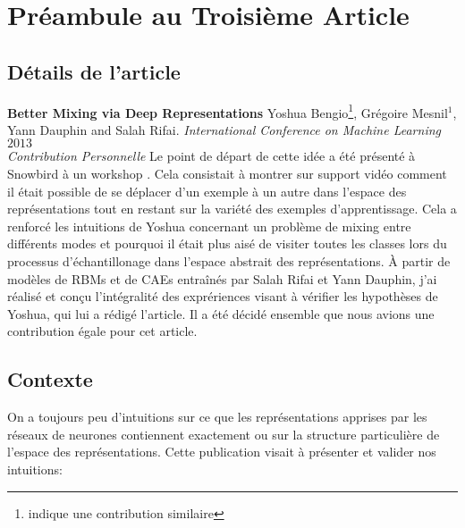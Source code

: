 \chapter{Pr\'{e}ambule au Troisi\`{e}me Article }

\section{D\'{e}tails de l'article}

{\bf Better Mixing via Deep Representations} Yoshua Bengio\footnote{indique une contribution similaire}, Grégoire Mesnil$^{1}$, Yann Dauphin and Salah Rifai. {\it
International Conference on Machine Learning} $2013$\\

{\it Contribution Personnelle} Le point de départ de cette idée a été présenté
à Snowbird à un workshop \citep{Mesnil-et-al-LW2012}. Cela consistait à montrer
sur support vidéo comment il était possible de se déplacer d'un exemple à un
autre dans l'espace des représentations tout en restant sur la variété des
exemples d'apprentissage. Cela a renforcé les intuitions de Yoshua concernant
un problème de mixing entre différents modes et pourquoi il était plus aisé
de visiter toutes les classes lors du processus d'échantillonage dans l'espace
abstrait des représentations. À partir de modèles de RBMs et de CAEs entraînés
par Salah Rifai et Yann Dauphin, j'ai réalisé et conçu l'intégralité des
exprériences visant à vérifier les hypothèses de Yoshua, qui lui a rédigé
l'article. Il a été décidé ensemble que nous avions une contribution égale pour
cet article.

\section{Contexte}

On a toujours peu d'intuitions sur ce que les représentations apprises par les
réseaux de neurones contiennent exactement ou sur la structure particulière de
l'espace des représentations. Cette publication visait à présenter et valider nos intuitions:

\begin{center}
 \end{center}

